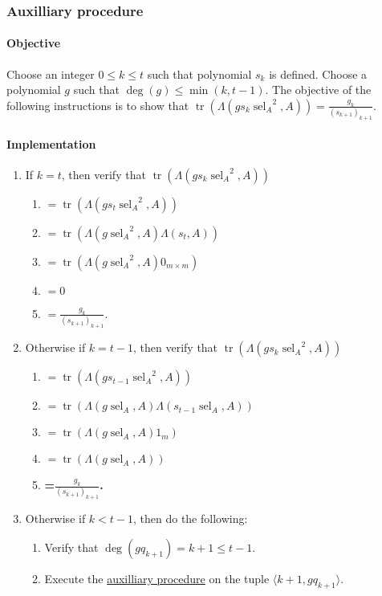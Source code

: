 \documentclass{article}
\DeclareMathOperator{\tr}{tr}
\DeclareMathOperator{\sel}{sel}
\newcounter{procedure}[part]
\begin{document}
\begin{multicols}{2}
			\subsubsection*{Auxilliary procedure}\label{sec:procedure 73 auxilliary procedure}
				\paragraph{Objective}
					Choose an integer $0\le k\le t$ such that polynomial $s_k$ is defined. Choose a polynomial $g$ such that $\deg(g)\le\min(k,t-1)$. The objective of the following instructions is to show that $\tr(\Lambda(gs_k{\sel_A}^2,A))=\frac{g_k}{(s_{k+1})_{k+1}}$.
				\paragraph{Implementation}
					\begin{enumerate}
						\item If $k=t$, then verify that $\tr(\Lambda(gs_k{\sel_A}^2,A))$
						\begin{enumerate}
							\item $=\tr(\Lambda(gs_t{\sel_A}^2,A))$
							\item $=\tr(\Lambda(g{\sel_A}^2,A)\Lambda(s_t,A))$
							\item $=\tr(\Lambda(g{\sel_A}^2,A)0_{m\times m})$
							\item $=0$
							\item $=\frac{g_k}{(s_{k+1})_{k+1}}$.
						\end{enumerate}
						\item Otherwise if $k=t-1$, then verify that $\tr(\Lambda(gs_k{\sel_A}^2,A))$
						\begin{enumerate}
							\item $=\tr(\Lambda(gs_{t-1}{\sel_A}^2,A))$
							\item $=\tr(\Lambda(g{\sel_A},A)\Lambda(s_{t-1}{\sel_A},A))$
							\item $=\tr(\Lambda(g\sel_A,A)1_{m})$
							\item $=\tr(\Lambda(g\sel_A,A))$
							\item \textbf{=$\frac{g_k}{(s_{k+1})_{k+1}}$.}
						\end{enumerate}
						\item Otherwise if $k<t-1$, then do the following:
						\begin{enumerate}
							\item Verify that $\deg(gq_{k+1})=k+1\le t-1$.
							\item Execute the \hyperref[sec:procedure 73 auxilliary procedure]{auxilliary procedure} on the tuple $\langle k+1, gq_{k+1}\rangle$.

\end{enumerate}
\end{enumerate}
\end{multicols}
\end{document}
